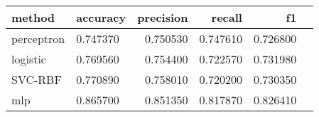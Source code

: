 \begin{tabular}{llrrrr}
\toprule
 method & accuracy & precision & recall & f1 \\
\midrule
 perceptron & 0.747370 & 0.750530 & 0.747610 & 0.726800 \\
 logistic & 0.769560 & 0.754400 & 0.722570 & 0.731980 \\
 SVC-RBF & 0.770890 & 0.758010 & 0.720200 & 0.730350 \\
 mlp & 0.865700 & 0.851350 & 0.817870 & 0.826410 \\
\bottomrule
\end{tabular}
